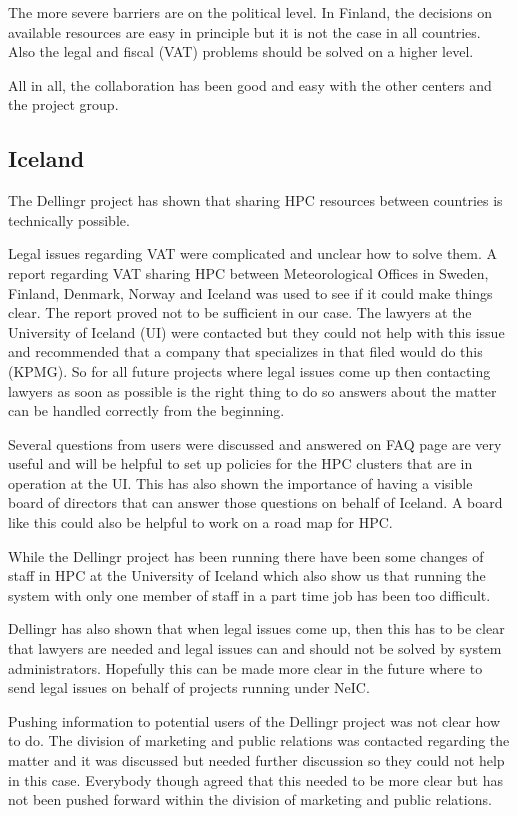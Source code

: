 \documentclass{article}
\newcommand{\dell}{Dellingr\xspace}
\begin{document}
The more severe barriers are on the political level. 
In Finland, the decisions on available resources are easy in principle but it is not the case in all countries. 
Also the legal and fiscal (VAT) problems should be solved on a higher level.

All in all, the collaboration has been good and easy with the other centers and the project group. 

\subsection{Iceland}

The \dell project has shown that sharing HPC resources between countries is technically possible.

Legal issues regarding VAT were complicated and unclear how to solve them. 
A report regarding VAT sharing HPC between Meteorological Offices in Sweden, Finland, Denmark, Norway and Iceland was used to see if it could make things clear. 
The report proved not to be sufficient in our case. 
The lawyers at the University of Iceland (UI) were contacted but they could not help with this issue and recommended that a company that specializes in that filed would do this (KPMG). 
So for all future projects where legal issues come up then contacting lawyers as soon as possible is the right thing to do so answers about the matter can be handled correctly from the beginning.

Several questions from users were discussed and answered on FAQ page are very useful and will be helpful to set up policies for the HPC clusters that are in operation at the UI. 
This has also shown the importance of having a visible board of directors that can answer those questions on behalf of Iceland. 
A board like this could also be helpful to work on a road map for HPC.

While the \dell project has been running there have been some changes of staff in HPC at the University of Iceland which also show us that running the system with only one member of staff in a part time job has been too difficult.

\dell has also shown that when legal issues come up, then this has to be clear that lawyers are needed and legal issues can and should not be solved by system administrators. 
Hopefully this can be made more clear in the future where to send legal issues on behalf of projects running under NeIC.

Pushing information to potential users of the \dell project was not clear how to do. 
The division of marketing and public relations was contacted regarding the matter and it was discussed but needed further discussion so they could not help in this case. 
Everybody though agreed that this needed to be more clear but has not been pushed forward within the division of marketing and public relations. 
\end{document}
